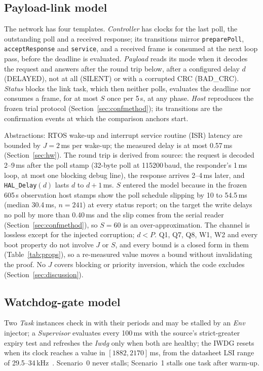 \documentclass[conference,a4paper]{IEEEtran}
\begin{document}
\subsection{Payload-link model}
\label{sec:models}
The network has four templates. \emph{Controller} has clocks for the last poll, the outstanding poll and a received response; its transitions mirror \texttt{preparePoll}, \texttt{acceptResponse} and \texttt{service}, and a received frame is consumed at the next loop pass, before the deadline is evaluated. \emph{Payload} reads its mode when it decodes the request and answers after the round trip below, after a configured delay $d$ (DELAYED), not at all (SILENT) or with a corrupted CRC (BAD\_CRC). \emph{Status} blocks the link task, which then neither polls, evaluates the deadline nor consumes a frame, for at most $S$ once per 5\,s, at any phase. \emph{Host} reproduces the frozen trial protocol (Section~\ref{sec:confmethod}); its transitions are the confirmation events at which the comparison anchors start.

Abstractions: RTOS wake-up and interrupt service routine (ISR) latency are bounded by $J{=}2$\,ms per wake-up; the measured delay is at most 0.57\,ms (Section~\ref{sec:hw}). The round trip is derived from source: the request is decoded 2--9\,ms after the poll stamp (32-byte poll at 115200\,baud, the responder's 1\,ms loop, at most one blocking debug line), the response arrives 2--4\,ms later, and \texttt{HAL\_Delay}$(d)$ lasts $d$ to $d{+}1$\,ms. $S$ entered the model because in the frozen 605\,s observation host stamps show the poll schedule slipping by 10 to 54.5\,ms (median 30.4\,ms, $n{=}241$) at every status report; on the target the write delays no poll by more than 0.40\,ms and the slip comes from the serial reader (Section~\ref{sec:confmethod}), so $S{=}60$ is an over-approximation. The channel is lossless except for the injected corruption; $d<P$. Q1, Q7, Q8, W1, W2 and every boot property do not involve $J$ or $S$, and every bound is a closed form in them (Table~\ref{tab:props}), so a re-measured value moves a bound without invalidating the proof. No $J$ covers blocking or priority inversion, which the code excludes (Section~\ref{sec:discussion}).



\subsection{Watchdog-gate model}
Two \emph{Task} instances check in with their periods and may be stalled by an \emph{Env} injector; a \emph{Supervisor} evaluates every 100\,ms with the source's strict-greater expiry test and refreshes the \emph{Iwdg} only when both are healthy; the IWDG resets when its clock reaches a value in $[1882,2170]$\,ms, from the datasheet LSI range of 29.5--34\,kHz~\cite{st2021ds12589}. Scenario~0 never stalls; Scenario~1 stalls one task after warm-up.
\end{document}
